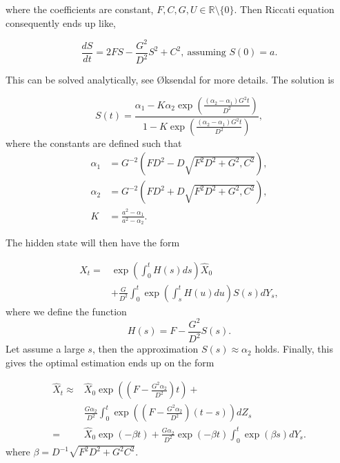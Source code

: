 where the coefficients are constant, $F,C,G,U \in \mathbb{R} \setminus \{ 0\}$. Then Riccati equation consequently ends up like,

\begin{equation*}
    \frac{d S}{dt} = 2FS - \frac{G^2}{D^2} S^2 + C^2, \ \text{assuming } S(0) = a.
\end{equation*}

This can be solved analytically, see Øksendal \cite[pp. 103]{øksendal2010stochastic} for more details. The solution is

$$
S(t)=\frac{\alpha_{1}-K \alpha_{2} \exp \left(\frac{\left(\alpha_{2}-\alpha_{1}\right) G^{2} t}{D^{2}}\right)}{1-K \exp \left(\frac{\left(\alpha_{2}-\alpha_{1}\right) G^{2} t}{D^{2}}\right)},
$$
where the constants are defined such that
\begin{align*}
\alpha_{1}&=G^{-2}\left(F D^{2}-D \sqrt{F^{2} D^{2}+G^{2}, C^{2}}\right), \\
\alpha_{2}&=G^{-2}\left(F D^{2}+D \sqrt{F^{2} D^{2}+G^{2}, C^{2}}\right), \\
K &=\frac{a^{2}-\alpha_{1}}{a^{2}-\alpha_{2}}.
\end{align*}

The hidden state will then have the form

\begin{align*}
\widehat{X}_{t}=&\exp \left(\int_{0}^{t} H(s) d s\right) \widehat{X}_{0} \\
&+\frac{G}{D^{2}} \int_{0}^{t} \exp \left(\int_{s}^{t} H(u) d u\right) S(s) d Y_{s},
\end{align*}
where we define the function
$$
H(s)=F-\frac{G^{2}}{D^{2}} S(s).
$$
Let assume a large $s$, then the approximation $S(s) \approx \alpha_{2}$ holds. Finally, this gives the optimal estimation ends up on the form

\begin{align*}
\widehat{X}_{t} \approx & \widehat{X}_{0} \exp \left(\left(F-\frac{G^{2} \alpha_{2}}{D^{2}}\right) t\right)+ \\
& \frac{G \alpha_{2}}{D^{2}} \int_{0}^{t} \exp \left(\left(F-\frac{G^{2} \alpha_{2}}{D^{2}}\right)(t-s)\right) d Z_{s} \\
=&\widehat{X}_{0} \exp (-\beta t)+\frac{G \alpha_{2}}{D^{2}} \exp (-\beta t) \int_{0}^{t} \exp (\beta s) d Y_{s}.
\end{align*}
where $\beta=D^{-1} \sqrt{F^{2} D^{2}+G^{2} C^{2}}$.


